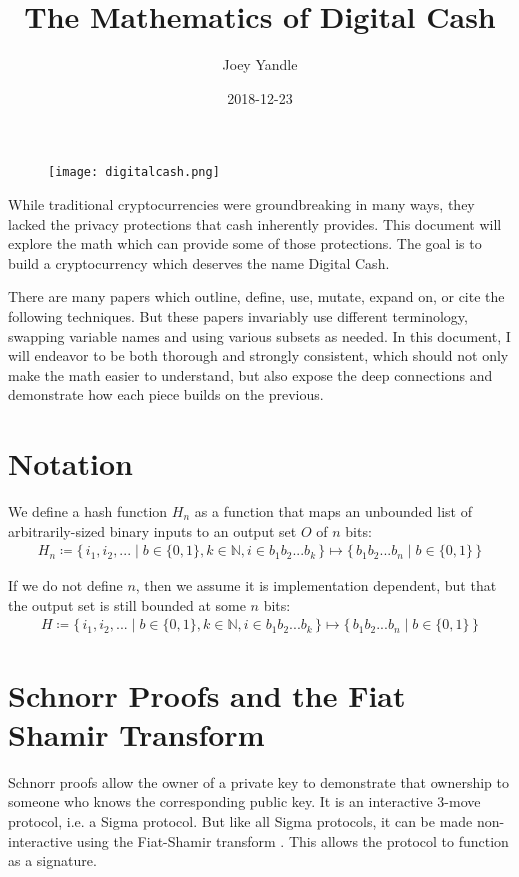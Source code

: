 \documentclass{article}
\title{The Mathematics of Digital Cash}
\date{2018-12-23}
\author{Joey Yandle}
\newcommand\Set[2]{\{\,#1\mid#2\,\}}
\begin{document}
\begin{figure}
  \texttt{[image: digitalcash.png]}
\end{figure}
\maketitle

While traditional cryptocurrencies were groundbreaking in many ways, they lacked the privacy protections that cash inherently provides.  This document will explore the math which can provide some of those protections.  The goal is to build a cryptocurrency which deserves the name Digital Cash.

There are many papers which outline, define, use, mutate, expand on, or cite the following techniques.  But these papers invariably use different terminology, swapping variable names and using various subsets as needed.  In this document, I will endeavor to be both thorough and strongly consistent, which should not only make the math easier to understand, but also expose the deep connections and demonstrate how each piece builds on the previous.
\newpage


\section{
  Notation
}

We define a hash function $H_n$ as a function that maps an unbounded list of arbitrarily-sized binary inputs to an output set $O$ of $n$ bits:
\begin{align}
  H_n \coloneqq \Set{i_1, i_2, ...}{b \in \{0,1\}, k \in \mathbb{N}, i \in {b_1b_2...b_k}} \mapsto \Set{b_1b_2...b_n}{b \in \{0,1\}}\nonumber
\end{align}

If we do not define $n$, then we assume it is implementation dependent, but that the output set is still bounded at some $n$ bits:
\begin{align}
  H \coloneqq \Set{i_1, i_2, ...}{b \in \{0,1\}, k \in \mathbb{N}, i \in {b_1b_2...b_k}} \mapsto \Set{b_1b_2...b_n}{b \in \{0,1\}}\nonumber
\end{align}


\section{
  Schnorr Proofs and the Fiat Shamir Transform
}

Schnorr proofs \cite{schnorr} allow the owner of a private key to demonstrate that ownership to someone who knows the corresponding public key.  It is an interactive 3-move protocol, i.e. a Sigma protocol.  But like all Sigma protocols, it can be made non-interactive using the Fiat-Shamir transform \cite{fiatshamir}.  This allows the protocol to function as a signature.
\end{document}
